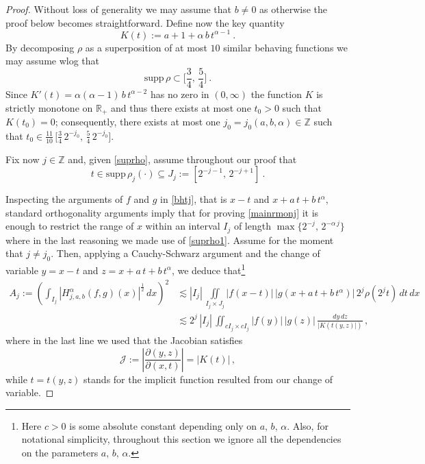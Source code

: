 \documentclass[a4paper,reqno]{amsart}
\numberwithin{equation}{section}
\theoremstyle{definition}
\newcommand{\R}{\mathbb{R}}
\newcommand{\Z}{\mathbb{Z}}
\def\a{\alpha}
\begin{document}
\begin{proof}

Without loss of generality we may assume that $b\not=0$ as otherwise the proof below becomes straightforward. Define now the key quantity
\begin{equation}\label{K}
K(t):=a+1+\a\,b\,t^{\a-1}\:.
\end{equation}
By decomposing $\rho$ as a superposition of at most $10$ similar behaving functions we may assume wlog that
\begin{equation}\label{suprho}
\textrm{supp}\,\rho\subset \Big[\frac{3}{4},\,\frac{5}{4}\Big]\:.
\end{equation}
Since $K'(t)=\a(\a-1)\,b\,t^{\a-2}$ has no zero in $(0,\infty)$ the function $K$ is strictly monotone on $\R_{+}$ and thus there exists at most one $t_0>0$ such that $K(t_0)=0$; consequently, there exists at most one $j_0=j_0(a,b,\a)\in\Z$ such that $t_0\in \frac{11}{10}\,\big[\frac{3}{4}\,2^{-j_0},\,\frac{5}{4}\,2^{-j_0}\big]$.
\vspace{.2cm}

Fix now $j\in\Z$ and, given \eqref{suprho}, assume throughout our proof that
\begin{equation}\label{suprho1}
t\in\textrm{supp}\,\rho_{j}(\cdot)\subseteq J_j:=[2^{-j-1},\,2^{-j+1}]\:.
\end{equation}

Inspecting the arguments of $f$ and $g$ in \eqref{bhtj}, that is $x-t$ and $x+a\,t+b\,t^\a$, standard orthogonality arguments imply that for proving \eqref{mainrmonj} it is enough to restrict the range of $x$ within an interval $I_j$ of length $\max\{2^{-j},\,2^{-\a\,j}\}$ where in the last reasoning we made use of \eqref{suprho1}. Assume for the moment that $j\not=j_0$. Then, applying a Cauchy-Schwarz argument and the change of variable $y=x-t$ and $z=x+a\,t+b\,t^\a$, we deduce that\footnote{Here $c>0$ is some absolute constant depending only on $a,\,b,\,\a$. Also, for notational simplicity, throughout this section we ignore all the dependencies on the parameters $a,\,b,\,\a$.}
\begin{align}
	A_{j}:=\left(\int_{I_j}|H_{j,a,b}^\a(f,g)(x)|^{\frac{1}{2}}\,dx\right)^2
	&\lesssim |I_j|\,\iint\limits_{I_j\times J_j} |f(x-t)|\, |g(x+a\,t+b\,t^\a)|\,2^j\rho(2^j t)\,dt\,dx\nonumber\\[1ex]
	&\lesssim 2^j\,|I_j|\,\iint_{c I_j\times c I_j} |f(y)|\, |g(z)|\,\frac{dy\,dz}{|K(t(y,z)|)}\,,\label{AI}
\end{align}
where in the last line we used that the Jacobian satisfies
$$\mathcal{J}:=\left|\frac{\partial (y,z)}{\partial (x,t)}\right|=|K(t)|\,,$$
while $t=t(y,z)$ stands for the implicit function resulted from our change of variable.


\end{proof}
\end{document}
